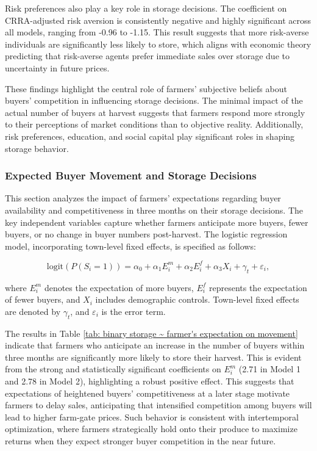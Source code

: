 \documentclass[12pt]{article}
\begin{document}
Risk preferences also play a key role in storage decisions. The coefficient on CRRA-adjusted risk aversion is consistently negative and highly significant across all models, ranging from -0.96 to -1.15. This result suggests that more risk-averse individuals are significantly less likely to store, which aligns with economic theory predicting that risk-averse agents prefer immediate sales over storage due to uncertainty in future prices.

These findings highlight the central role of farmers' subjective beliefs about buyers' competition in influencing storage decisions. The minimal impact of the actual number of buyers at harvest suggests that farmers respond more strongly to their perceptions of market conditions than to objective reality. Additionally, risk preferences, education, and social capital play significant roles in shaping storage behavior.



\subsubsection{Expected Buyer Movement and Storage Decisions}

\noindent This section analyzes the impact of farmers' expectations regarding buyer availability and competitiveness in three months on their storage decisions. The key independent variables capture whether farmers anticipate more buyers, fewer buyers, or no change in buyer numbers post-harvest. The logistic regression model, incorporating town-level fixed effects, is specified as follows:

\begin{equation}
    \text{logit} \left( P(S_i = 1) \right) = \alpha_0 + \alpha_1 E^m_i + \alpha_2 E^f_i + \alpha_3 X_i + \gamma_t + \varepsilon_i,
\end{equation}

where $E^m_i$ denotes the expectation of more buyers, $E^f_i$ represents the expectation of fewer buyers, and $X_i$ includes demographic controls. Town-level fixed effects are denoted by $\gamma_t$, and $\varepsilon_i$ is the error term.



The results in Table \ref{tab: binary storage ~ farmer's expectation on movement} indicate that farmers who anticipate an increase in the number of buyers within three months are significantly more likely to store their harvest. This is evident from the strong and statistically significant coefficients on $E^m_i$ (2.71 in Model 1 and 2.78 in Model 2), highlighting a robust positive effect. This suggests that expectations of heightened buyers' competitiveness at a later stage motivate farmers to delay sales, anticipating that intensified competition among buyers will lead to higher farm-gate prices. Such behavior is consistent with intertemporal optimization, where farmers strategically hold onto their produce to maximize returns when they expect stronger buyer competition in the near future.  
\end{document}
